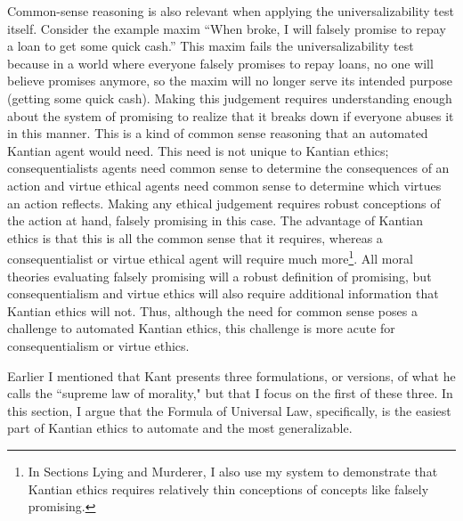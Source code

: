 \begin{isabellebody}
\begin{isamarkuptext}
Common-sense reasoning is also relevant when applying the universalizability test itself. Consider the example
maxim ``When broke, I will falsely promise to repay a loan
to get some quick cash.'' This maxim fails the universalizability test because in a world where everyone
falsely promises to repay loans, no one will believe promises anymore, so the maxim will no longer serve
its intended purpose (getting some quick cash). Making this judgement requires understanding enough about
the system of promising to realize that it breaks down if everyone abuses it in this manner. This is a
kind of common sense reasoning that an automated Kantian agent would need. This need is not unique to
Kantian ethics; consequentialists agents need common sense to determine the consequences of 
an action and virtue ethical agents need common sense to determine which virtues an action
reflects. Making any ethical judgement requires robust conceptions of the action
at hand, falsely promising in this case. The advantage of Kantian ethics is that this is all the common 
sense that it requires, whereas a consequentialist or virtue ethical agent will require much more\footnote{
In Sections Lying and Murderer, I also use my system to demonstrate that Kantian ethics requires relatively thin conceptions 
of concepts like falsely promising.}. All
moral theories evaluating falsely promising will a robust definition of promising, 
but consequentialism and virtue ethics will also require additional information
that Kantian ethics will not. Thus, although the need for common sense poses a challenge to automated
Kantian ethics, this challenge is more acute for consequentialism or virtue ethics.%
\end{isamarkuptext}\isamarkuptrue%
%
\isadelimdocument
%
\endisadelimdocument
%
\isatagdocument
%
\isamarkuptrue%
%
\endisatagdocument
{\isafolddocument}%
%
\isadelimdocument
%
\endisadelimdocument
%
\begin{isamarkuptext}%
Earlier I mentioned that Kant presents three formulations, or versions, 
of what he calls the ``supreme law of morality," but that I focus on the first of these three. In this section, 
I argue that the Formula of Universal Law, specifically, is the easiest part of Kantian ethics to automate
and the most generalizable.


\end{isamarkuptext}
\end{isabellebody}
